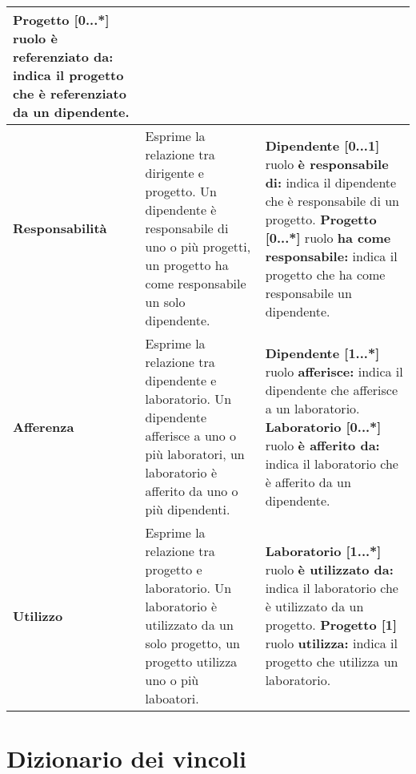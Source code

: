 \begin{xltabular}{\textwidth}{l X X}
        \newline\textbf{Progetto [0...*]} ruolo \textbf{è referenziato da:} indica il progetto che è referenziato da un dipendente.\\
        \hline
        \textbf{Responsabilità} & Esprime la relazione tra dirigente e progetto. Un dipendente è responsabile di uno o più progetti, un progetto ha come responsabile un solo dipendente. & \textbf{Dipendente [0...1]} ruolo \textbf{è responsabile di:} indica il dipendente che è responsabile di un progetto. 
        \newline\textbf{Progetto [0...*]} ruolo \textbf{ha come responsabile:} indica il progetto che ha come responsabile un dipendente.\\
        \hline
        \textbf{Afferenza} & Esprime la relazione tra dipendente e laboratorio. Un dipendente afferisce a uno o più laboratori, un laboratorio è afferito da uno o più dipendenti. & \textbf{Dipendente [1...*]} ruolo \textbf{afferisce:} indica il dipendente che afferisce a un laboratorio. \newline\textbf{Laboratorio [0...*]} ruolo \textbf{è afferito da:} indica il laboratorio che è afferito da un dipendente. \\
        \hline
        \textbf{Utilizzo} & Esprime la relazione tra progetto e laboratorio. Un laboratorio è utilizzato da un solo progetto, un progetto utilizza uno o più laboatori. & \textbf{Laboratorio [1...*]} ruolo \textbf{è utilizzato da:} indica il laboratorio che è utilizzato da un progetto. \newline\textbf{Progetto [1]} ruolo \textbf{utilizza:} indica il progetto che utilizza un laboratorio. \\

    \end{xltabular}
\endgroup

\newpage
\section{Dizionario dei vincoli}

